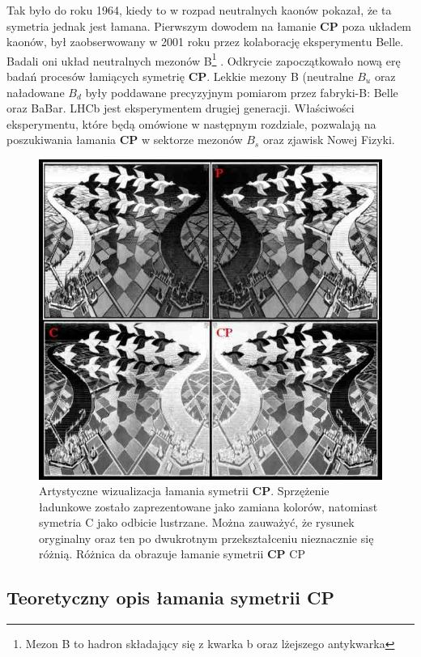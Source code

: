  Tak było do roku 1964, kiedy to w rozpad neutralnych kaonów pokazał, że ta symetria jednak jest łamana. Pierwszym dowodem na łamanie  \textbf{CP} poza układem kaonów, był zaobserwowany w 2001 roku przez kolaborację eksperymentu Belle. Badali oni układ neutralnych mezonów B\footnote{Mezon B to hadron składający się z kwarka b oraz lżejszego antykwarka } . Odkrycie zapoczątkowało nową erę badań procesów łamiących symetrię  \textbf{CP}. Lekkie mezony B (neutralne $B_u$ oraz naładowane $B_d$ były poddawane precyzyjnym pomiarom przez fabryki-B: Belle oraz BaBar. LHCb jest eksperymentem drugiej generacji. Właściwości eksperymentu, które będą omówione w następnym rozdziale, pozwalają na poszukiwania łamania \textbf{CP}  w sektorze mezonów $B_{s}$ oraz zjawisk Nowej Fizyki.
 \begin{figure}[ht]
 \centering
 \includegraphics[scale=0.7]{rozdzial1/CPV.jpg}
 \caption{Artystyczne wizualizacja łamania symetrii \textbf{CP}. Sprzężenie ładunkowe zostało zaprezentowane jako zamiana kolorów, natomiast symetria C jako odbicie lustrzane. Można zauważyć, że rysunek oryginalny oraz ten po dwukrotnym przekształceniu nieznacznie się różnią. Różnica da obrazuje łamanie symetrii \textbf{CP} CP}
 \label{fig:CP}
\end{figure} 
\subsection{Teoretyczny opis łamania symetrii \textbf{CP} }

